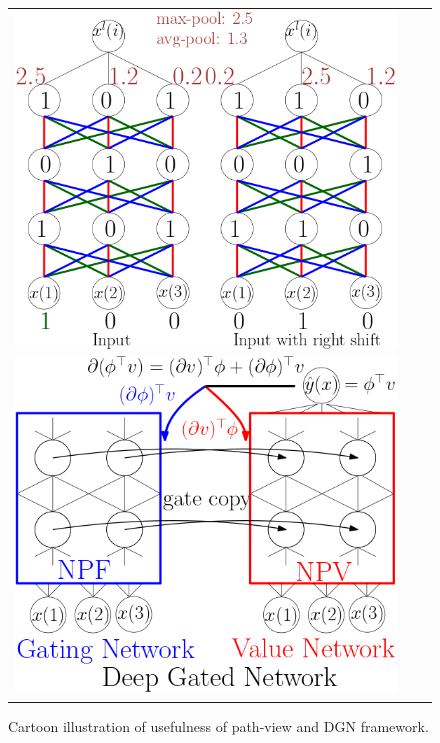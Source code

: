 \begin{figure}[t]
{\begin{tabular}{ccc}
\includegraphics[scale=0.5]{figs/nnconv.png}
\includegraphics[scale=0.5]{figs/nntwin-blck.png}
\end{tabular}
}
\caption{Cartoon illustration of usefulness of path-view and DGN framework.}
\label{fig:cartoon}
\end{figure}
